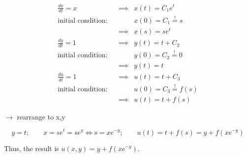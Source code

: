 \begin{align*}
 \frac{dx}{dt} = x & &  \implies & x(t) = C_{1}e^t \\
 \text{initial condition:}  & &  & x(0) = C_{1} \stackrel{!}{=} s \\
 &  & \implies & x(s) = se^t \\
\frac{dy}{dt} = 1 &  & \implies  & y(t) = t+C_{2} \\
\text{initial condition:}  &  &  & y(0) = C_{2} \stackrel{!}{=} 0 \\
 &  & \implies & y(t) = t \\
\frac{du}{dt} = 1 &  & \implies & u(t) = t+C_{3} \\
\text{initial condition:} &  &  & u(0) = C_{3} \stackrel{!}{=} f(s) \\
 &  & \implies & u(t) = t + f(s)
\end{align*}

$\to$ rearrange to x,y

$$
y=t;\quad\quad x=se^t = se^y \iff s=xe^{-y};\quad\quad u(t) = t+f(s) = y + f(xe^{-y})
$$

Thus, the result is $u(x,y) = y + f(xe^{-y})$.
